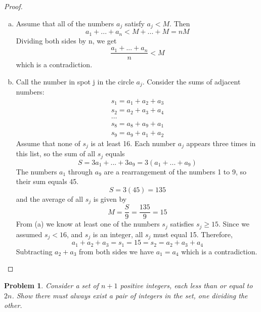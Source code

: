 \documentclass[11pt]{article}
\newtheorem{problem}{Problem}
\theoremstyle{definition}
\theoremstyle{case}
\begin{document}
\begin{proof}
    \begin{enumerate}[(a)]
    \item Assume that all of the numbers $a_j$ satisfy $a_j < M$.
    Then \[a_1 + ... + a_n < M + ... + M = nM\]Dividing both sides by n, we get
    \[\frac{a_1 + ... + a_n}{n} < M\] which is a contradiction.
    \item 
        Call the number in spot j in the circle $a_j$. Consider the sums of adjacent numbers:
        \begin{gather*}
            s_1 = a_1 + a_2 + a_3\\
            s_2 = a_2 + a_3 + a_4\\
            \dots\\
            s_8 = a_8 + a_9 + a_1\\
            s_9 = a_9 + a_1 + a_2
        \end{gather*}
        Assume that none of $s_j$ is at least 16. Each number $a_j$ appears three times in this list, so the sum of all $s_j$ equals
        \[S = 3a_1 + ... + 3a_9 = 3(a_1 + ... + a_9)\]
        The numbers $a_1$ through $a_9$ are a rearrangement of the numbers 1 to 9, so their sum equals 45.
        \[S = 3(45)=135\] and the average of all $s_j$ is given by
        \[M = \frac{S}{9} = \frac{135}{9} = 15\]
        From (a) we know at least one of the numbers $s_j$ satisfies $s_j \geq 15$.
        Since we assumed $s_j < 16$, and $s_j$ is an integer, all $s_j$ must equal 15. Therefore,
        \[a_1 + a_2 + a_3 = s_1 = 15 = s_2 = a_2 + a_3 + a_4\]
        Subtracting $a_2 + a_3$ from both sides we have $a_1 = a_4$ which is a contradiction.
    \end{enumerate}
\end{proof}

\begin{problem}
Consider a set of $n+1$ positive integers, each less than or equal to $2n$. Show there must always exist a pair of integers in the set, one dividing the other. 
\end{problem} 
\end{document}
